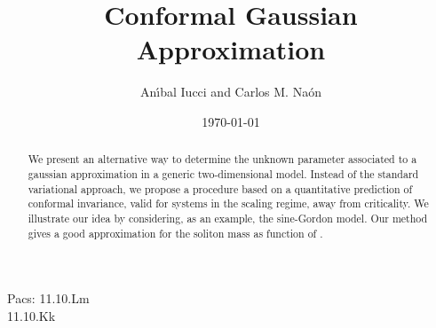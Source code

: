 \documentclass[a4paper,12pt]{article}
\begin{document}
\thispagestyle{empty}
\providecommand{\unmedio}{{\scriptstyle\frac{1}{2}}}
\providecommand{\eff}{_{\text{eff}}}
\providecommand{\Infinity}{\infty}
\providecommand{\flip}{_{\text{flip}}}
\providecommand{\bos}{_{0\text{B}}}
\providecommand{\bosonic}{_{\text{bos}}}
\providecommand{\ferm}{_{0\text{F}}}
\providecommand{\trial}{_{\text{trial}}}
\providecommand{\true}{_{\text{true}}}
\providecommand{\Ci}{\operatorname{Ci}}
\providecommand{\tr}{\operatorname{tr}}

\providecommand{\PsiB}{\bar{\Psi}}   %
\providecommand{\phiH}{\hat{\phi}}
\providecommand{\etaH}{\hat{\eta}}
\providecommand{\chiB}{\bar{\chi}}
\providecommand{\xiH}{\hat{\xi}}
\providecommand{\zetaH}{\hat{\zeta}}
\providecommand{\vH}{\hat{v}}
\providecommand{\bH}{\hat{b}}

\providecommand{\AB}{\bar{A}_\mu}
\providecommand{\BB}{\bar{B}_\mu}
\providecommand{\AT}{\tilde{A}_\mu}
\providecommand{\BT}{\tilde{B}_\mu}

\providecommand{\slp}{\raise.15ex\hbox{\myHighlight{$/$}\coordHE{}}\kern-.57em\hbox{\myHighlight{$\partial$}\coordHE{}}}
\providecommand{\slA}{\raise.15ex\hbox{\myHighlight{$/$}\coordHE{}}\kern-.63em\hbox{\myHighlight{$A$}\coordHE{}}}

\providecommand{\difp}{\frac{d^2p}{(2\pi)^2}\,}

\providecommand{\bra}{\left\langle}
\providecommand{\ket}{\right\rangle}
\providecommand{\bracket}{\left\langle\,\right\rangle}

\providecommand{\D}{\mathcal{D}}
\providecommand{\N}{\mathcal{N}}
\providecommand{\Lag}{\mathcal{L}}
\providecommand{\V}{\mathcal{V}}
\providecommand{\Z}{\mathcal{Z}}






\title{Conformal Gaussian Approximation}
\author{An\'{\i}bal Iucci\coordHE{} and Carlos M. Na\'on\coordHE{}}
\date{\today}



\maketitle
\begin{abstract}
We present an alternative way to determine the unknown parameter associated to a
gaussian approximation in a generic two-dimensional model. Instead of the standard
variational approach, we propose a procedure based on a quantitative prediction of
conformal invariance, valid for systems in the scaling regime, away from criticality.
We illustrate our idea by considering, as an example, the sine-Gordon model. Our
method gives a good approximation for the soliton mass as function of \myHighlight{$\beta$}\coordHE{}.
\end{abstract}
\vspace{3cm} Pacs: 11.10.Lm\\ \hspace*{1,7 cm} 11.10.Kk
\end{document}
